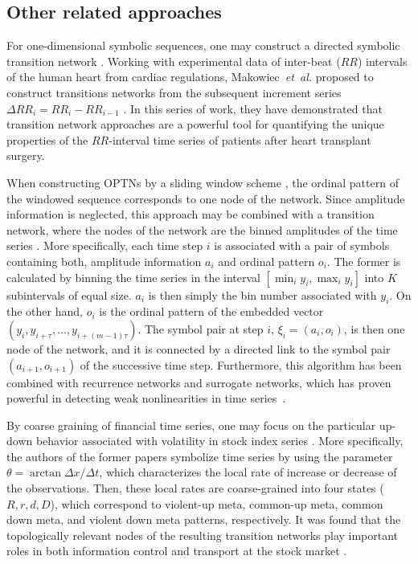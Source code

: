 \subsection{Other related approaches}

		For one-dimensional symbolic sequences, one may construct a directed symbolic transition network \cite{Emmert2012}. Working with experimental data of inter-beat ($RR$) intervals of the human heart from cardiac regulations, Makowiec~\emph{et~al.} proposed to construct transitions networks from the subsequent increment series $\Delta RR_i = RR_i - RR_{i-1}$ \cite{Makowiec2013,Makowiec2013b,Makowiec2014b,Makowiec2015,Makowiec2015b,Makowiec2016}. In this series of work, they have demonstrated that transition network approaches are a powerful tool for quantifying the unique properties of the $RR$-interval time series of patients after heart transplant surgery. 
		
		When constructing OPTNs by a sliding window scheme \cite{Small2013}, the ordinal pattern of the windowed sequence corresponds to one node of the network. Since amplitude information is neglected, this approach may be combined with a transition network, where the nodes of the network are the binned amplitudes of the time series \cite{Sun2014}. More specifically, each time step $i$ is associated with a pair of symbols containing both, amplitude information $a_i$ and ordinal pattern $o_i$. The former is calculated by binning the time series in the interval $[\min_i y_i, \max_i y_i]$ into $K$ subintervals of equal size. $a_i$ is then simply the bin number associated with $y_i$. On the other hand, $o_i$ is the ordinal pattern of the embedded vector $(y_i, y_{i+\tau}, \dots, y_{i+(m-1)\tau})$. The symbol pair at step $i$, $\xi_i=(a_i,o_i)$, is then one node of the network, and it is connected by a directed link to the symbol pair $(a_{i+1},o_{i+1})$ of the successive time step. Furthermore, this algorithm has been combined with recurrence networks and surrogate networks, which has proven powerful in detecting weak nonlinearities in time series~\cite{Laut2016}. 
		
		By coarse graining of financial time series, one may focus on the particular up-down behavior associated with volatility in stock index series \cite{Li2006b,Li2007a}. More specifically, the authors of the former papers symbolize time series by using the parameter $\theta = \arctan \Delta x / \Delta t$, which characterizes the local rate of increase or decrease of the observations. Then, these local rates are coarse-grained into four states ($R, r, d, D$), which correspond to violent-up meta, common-up meta, common down meta, and violent down meta patterns, respectively. It was found that the topologically relevant nodes of the resulting transition networks play important roles in both information control and transport at the stock market \cite{Li2007a}. 
		
